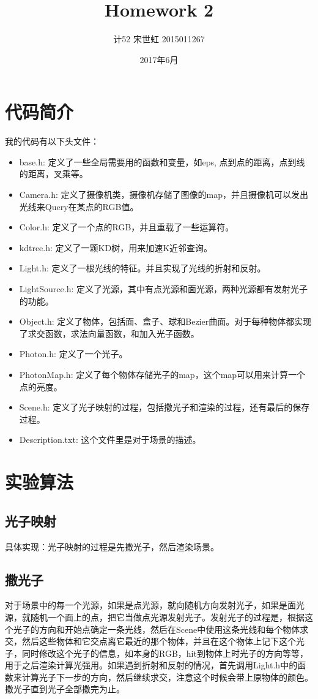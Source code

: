 \documentclass[10pt, a4paper]{article}
\title{Homework 2}
\author{计52 宋世虹 2015011267}
\date{2017年6月}
\begin{document}
	\maketitle

  \section{代码简介}
    我的代码有以下头文件：
      \begin{itemize}
        \item base.h: 定义了一些全局需要用的函数和变量，如eps, 点到点的距离，点到线的距离，叉乘等。
        \item Camera.h: 定义了摄像机类，摄像机存储了图像的map，并且摄像机可以发出光线来Query在某点的RGB值。
        \item Color.h:
        定义了一个点的RGB，并且重载了一些运算符。
        \item kdtree.h:
        定义了一颗KD树，用来加速K近邻查询。
        \item Light.h:
        定义了一根光线的特征。并且实现了光线的折射和反射。
        \item LightSource.h:
        定义了光源，其中有点光源和面光源，两种光源都有发射光子的功能。
        \item Object.h:
        定义了物体，包括面、盒子、球和Bezier曲面。对于每种物体都实现了求交函数，求法向量函数，和加入光子函数。
        \item Photon.h:
        定义了一个光子。
        \item PhotonMap.h:
        定义了每个物体存储光子的map，这个map可以用来计算一个点的亮度。
        \item Scene.h:
        定义了光子映射的过程，包括撒光子和渲染的过程，还有最后的保存过程。
        \item Description.txt:
        这个文件里是对于场景的描述。
      \end{itemize}
  \section{实验算法}
    \subsection{光子映射}
      具体实现：光子映射的过程是先撒光子，然后渲染场景。
      \subsection{撒光子}
        对于场景中的每一个光源，如果是点光源，就向随机方向发射光子，如果是面光源，就随机一个面上的点，把它当做点光源发射光子。发射光子的过程是，根据这个光子的方向和开始点确定一条光线，然后在Scene中使用这条光线和每个物体求交，然后这些物体和它交点离它最近的那个物体，并且在这个物体上记下这个光子，同时修改这个光子的信息，如本身的RGB，hit到物体上时光子的方向等等，用于之后渲染计算光强用。如果遇到折射和反射的情况，首先调用Light.h中的函数来计算光子下一步的方向，然后继续求交，注意这个时候会带上原物体的颜色。撒光子直到光子全部撒完为止。
\end{document}
